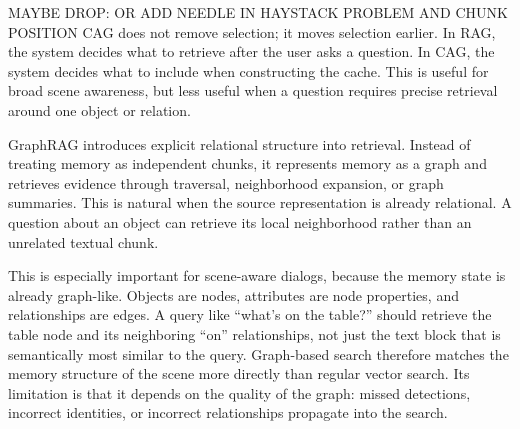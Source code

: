MAYBE DROP: OR ADD NEEDLE IN HAYSTACK PROBLEM AND CHUNK POSITION CAG does not remove selection; it moves selection earlier. In RAG, the system decides what to retrieve after the user asks a question. In CAG, the system decides what to include when constructing the cache. This is useful for broad scene awareness, but less useful when a question requires precise retrieval around one object or relation.

GraphRAG introduces explicit relational structure into retrieval. Instead of treating memory as independent chunks, it represents memory as a graph and retrieves evidence through traversal, neighborhood expansion, or graph summaries. This is natural when the source representation is already relational. A question about an object can retrieve its local neighborhood rather than an unrelated textual chunk.

This is especially important for scene-aware dialogs, because the memory state is already graph-like. Objects are nodes, attributes are node properties, and relationships are edges. A query like \enquote{what's on the table?} should retrieve the table node and its neighboring \enquote{on} relationships, not just the text block that is semantically most similar to the query. Graph-based search therefore matches the memory structure of the scene more directly than regular vector search. Its limitation is that it depends on the quality of the graph: missed detections, incorrect identities, or incorrect relationships propagate into the search.




